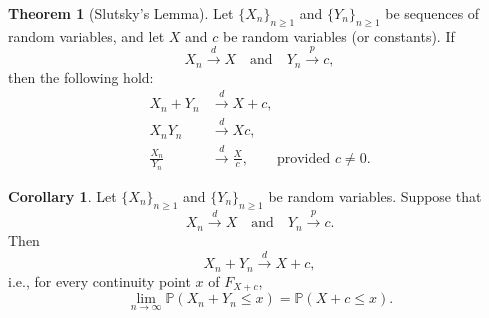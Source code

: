 \documentclass[11pt]{article}
\theoremstyle{definition}
\newtheorem{theo}{Theorem}[section]
\newtheorem{corollary}{Corollary}[section]
\begin{document}
\begin{theo}[Slutsky's Lemma]
Let $\{X_n\}_{n\ge1}$ and $\{Y_n\}_{n\ge1}$ be sequences of random variables, and let $X$ and $c$ be random variables (or constants).  
If
\[
X_n \xrightarrow{d} X
\quad \text{and} \quad
Y_n \xrightarrow{p} c,
\]
then the following hold:
\begin{align*}
X_n + Y_n &\xrightarrow{d} X + c, \\
X_n Y_n &\xrightarrow{d} X c, \\
\frac{X_n}{Y_n} &\xrightarrow{d} \frac{X}{c}, \qquad \text{provided } c \neq 0.
\end{align*}
\end{theo}

\begin{corollary}
Let $\{X_n\}_{n\ge1}$ and $\{Y_n\}_{n\ge1}$ be random variables. Suppose that
\[
X_n \xrightarrow{d} X
\quad \text{and} \quad
Y_n \xrightarrow{p} c.
\]
Then
\[
X_n + Y_n \xrightarrow{d} X + c,
\]
i.e., for every continuity point $x$ of $F_{X+c}$,
\[
\lim_{n\to\infty} \mathbb{P}(X_n + Y_n \le x)
= \mathbb{P}(X + c \le x).
\]
\end{corollary}
\end{document}
